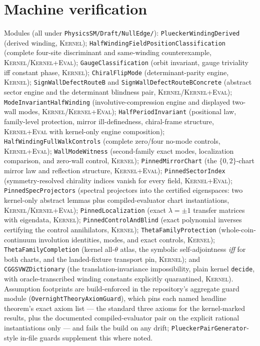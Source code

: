 \documentclass[11pt]{article}
\newcommand{\Kernel}{\textcolor{kernelcolor}{\textsc{Kernel}}}
\newcommand{\DraftTrust}{\textcolor{draftcolor}{\textsc{Kernel+Eval}}}
\begin{document}
\appendix
\section{Machine verification}

Modules (all under \texttt{PhysicsSM/Draft/NullEdge/}):
\texttt{PlueckerWindingDerived} (derived winding, \Kernel{});
\texttt{HalfWindingFieldPositionClassification} (complete four-site
discriminant and same-winding counterexample, \Kernel{}/\DraftTrust{});
\texttt{GaugeClassification} (orbit invariant, gauge triviality iff
constant phase, \Kernel{}); \texttt{ChiralFlipMode} (determinant-parity
engine, \Kernel{}); \texttt{SignWallDefectRouteB} and
\texttt{SignWallDefectRouteBConcrete} (abstract sector engine and the
determinant blindness pair, \Kernel{}/\DraftTrust{});
\texttt{ModeInvariantHalfWinding} (involutive-compression engine and displayed
two-wall modes, \Kernel{}/\DraftTrust{});
\texttt{HalfPeriodInvariant} (positional law, family-level protection,
mirror ill-definedness, chiral-frame structure, \DraftTrust{} with
kernel-only engine composition);
\texttt{HalfWindingFullWalkControls} (complete zero/four no-mode controls,
\DraftTrust{}); \texttt{WallModeWitness} (second-family exact modes,
localization comparison, and zero-wall control, \Kernel{});
\texttt{PinnedMirrorChart} (the $\{0,2\}$-chart mirror law and
reflection structure, \DraftTrust{}); \texttt{PinnedSectorIndex}
(symmetry-resolved chirality indices vanish for every field,
\DraftTrust{}); \texttt{PinnedSpecProjectors} (spectral projectors into
the certified eigenspaces: two kernel-only abstract lemmas plus
compiled-evaluator chart instantiations, \Kernel{}/\DraftTrust{});
\texttt{PinnedLocalization} (exact
$\lambda=\pm1$ transfer matrices with eigendata, \Kernel{});
\texttt{PinnedControlAndBlind} (exact polynomial inverses certifying the
control annihilators, \Kernel{});
\texttt{ThetaFamilyProtection} (whole-coin-continuum involution
identities, modes, and exact controls, \Kernel{});
\texttt{ThetaFamilyCompletion} (kernel all-$\theta$ atlas, the symbolic
self-adjointness \emph{iff} for both charts, and the landed-fixture
transport pin, \Kernel{}); and \texttt{CGGSVWZDictionary} (the
translation-invariance impossibility, plain kernel \texttt{decide}, with
oracle-transcribed winding constants explicitly quarantined,
\Kernel{}).
Assumption footprints are build-enforced in the repository's aggregate
guard module (\texttt{OvernightTheoryAxiomGuard}), which pins each named
headline theorem's exact axiom list --- the standard three axioms for the
kernel-marked results, plus the documented compiled-evaluator pair on
the explicit rational instantiations only --- and fails the build on any
drift; \texttt{PlueckerPairGenerator}-style in-file guards supplement
this where noted.
\end{document}
